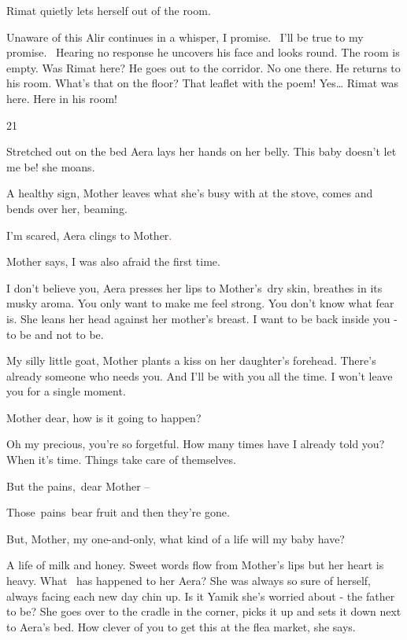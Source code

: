\documentclass[letterpaper]{article}
\begin{document}
Rimat quietly lets herself out of the room.

Unaware of this Alir continues in a whisper, {\textquotedbl}I promise. \ I'll be true to my promise.{\textquotedbl}~
Hearing no response he uncovers his face and looks round. The room is empty. Was Rimat here? He goes out to the
corridor. No one there. He returns to his room. What's that on the floor? That leaflet with the poem! Yes{\dots} Rimat
was here. Here in his room!


\bigskip

21 

Stretched out on the bed Aera lays her hands on her belly. {\textquotedbl}This baby doesn't let me be!{\textquotedbl}
she moans.

{\textquotedbl}A healthy sign,{\textquotedbl} Mother leaves what she's busy with at the stove, comes and bends over her,
beaming. 

{\textquotedbl}I'm scared,{\textquotedbl} Aera clings to Mother\textcolor{red}{.}

Mother says, {\textquotedbl}I was also afraid the\textcolor{red}{ }first time.{\textquotedbl} 

{\textquotedbl}I don't believe you,{\textquotedbl} Aera presses her lips\textcolor{red}{ }to Mother's~dry skin, breathes
in its musky aroma. {\textquotedbl}You only want to make me feel strong. You don't know what fear is.{\textquotedbl}
She leans her head against her mother's breast. {\textquotedbl}I want to be back inside you - to be and not to
be.{\textquotedbl} 

{\textquotedbl}My silly little goat,{\textquotedbl} Mother plants a kiss on her daughter's forehead.
{\textquotedbl}There's already someone who needs you. And I'll be with you all the time. I won't leave you for a single
moment.{\textquotedbl} 

{\textquotedbl}Mother dear, how is it going to happen?{\textquotedbl} 

{\textquotedbl}Oh my precious, you're so forgetful. How many times have I already told you? When it's time. Things take
care of themselves.{\textquotedbl} 

{\textquotedbl}But the pains,~dear Mother -- {\textquotedbl} 

{\textquotedbl}Those~pains~bear fruit and then they're gone.{\textquotedbl} 

{\textquotedbl}But, Mother, my one-and-only, what kind of a life will my baby have?{\textquotedbl} 

{\textquotedbl}A life of milk and honey.{\textquotedbl} Sweet words flow from Mother's lips but her heart is heavy. What
\ has happened to her Aera? She was always so sure of herself, always facing each new day chin up. Is it Yamik she's
worried about - the father to be? She goes over to the cradle in the corner, picks it up and sets it down next to
Aera's bed. {\textquotedbl}How clever of you to get this at the flea market,{\textquotedbl} she says. 
\end{document}
